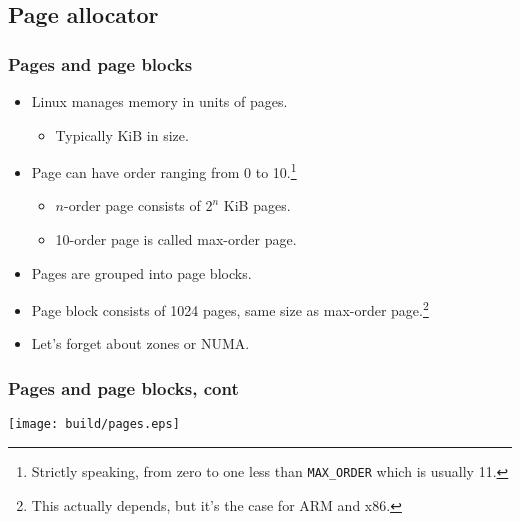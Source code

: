 \subsection{Page allocator}

\begin{frame}[fragile]
  \frametitle{Pages and page blocks}

  \begin{itemize}
  \item Linux manages memory in units of pages.
    \begin{itemize}
    \item Typically \unit[4]{KiB} in size.
    \end{itemize}
  \item Page can have order ranging from 0 to 10.\footnote{Strictly
    speaking, from zero to one less than \lstinline|MAX_ORDER| which is
    usually 11.}
    \begin{itemize}
    \item $n$-order page consists of $2^n$ \unit[4]{KiB} pages.
    \item 10-order page is called max-order page.
    \end{itemize}
  \item Pages are grouped into page blocks.
  \item Page block consists of 1024 pages, same size as max-order
    page.\footnote{This actually depends, but it's the case for ARM
      and x86.}
  \item {\footnotesize Let's forget about zones or NUMA.}
  \end{itemize}
\end{frame}

\begin{frame}
  \frametitle{Pages and page blocks, cont}
  \begin{centering}
  \texttt{[image: build/pages.eps]}
  \end{centering}
\end{frame}


